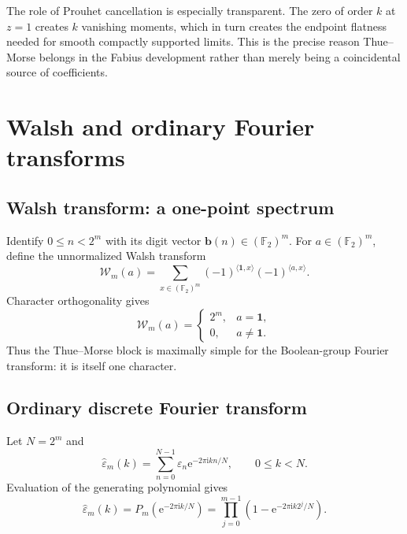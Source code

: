 \documentclass[11pt,oneside]{article}
\theoremstyle{definition}
\theoremstyle{remark}
\newcommand{\Ftwo}{\mathbb F_2}
\newcommand{\e}{\mathrm e}
\newcommand{\ii}{\mathrm i}
\newcommand{\eps}{\varepsilon}
\begin{document}
The role of Prouhet cancellation is especially transparent.  The zero of order
$k$ at $z=1$ creates $k$ vanishing moments, which in turn creates the endpoint
flatness needed for smooth compactly supported limits.  This is the precise
reason Thue--Morse belongs in the Fabius development rather than merely being a
coincidental source of coefficients.

\section{Walsh and ordinary Fourier transforms}

\subsection{Walsh transform: a one-point spectrum}

Identify $0\le n<2^m$ with its digit vector
$\mathbf b(n)\in(\Ftwo)^m$.  For $a\in(\Ftwo)^m$, define the unnormalized
Walsh transform
\begin{equation}\label{p3:eq:walsh-transform-def}
 \mathcal W_m(a)=\sum_{x\in(\Ftwo)^m}
  (-1)^{\langle\mathbf1,x\rangle}(-1)^{\langle a,x\rangle}.
\end{equation}
Character orthogonality gives
\begin{equation}\label{p3:eq:walsh-one-point}
 \boxed{\qquad
 \mathcal W_m(a)=
 \begin{cases}
 2^m,&a=\mathbf1,\\
 0,&a\ne\mathbf1.
 \end{cases}
 \qquad}
\end{equation}
Thus the Thue--Morse block is maximally simple for the Boolean-group Fourier
transform: it is itself one character.

\subsection{Ordinary discrete Fourier transform}

Let $N=2^m$ and
\begin{equation}\label{p3:eq:dft-def}
 \widehat\eps_m(k)=\sum_{n=0}^{N-1}\eps_n
  \e^{-2\pi\ii kn/N},
 \qquad 0\le k<N.
\end{equation}
Evaluation of the generating polynomial gives
\begin{equation}\label{p3:eq:dft-product}
 \boxed{\qquad
 \widehat\eps_m(k)=P_m\!\left(\e^{-2\pi\ii k/N}\right)
 =\prod_{j=0}^{m-1}
  \left(1-\e^{-2\pi\ii k2^j/N}\right).
 \qquad}
\end{equation}
\end{document}
